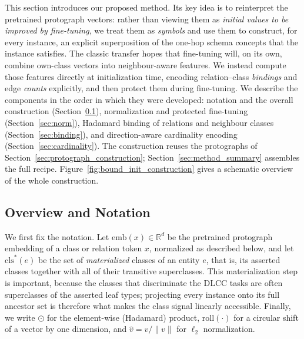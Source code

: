 \documentclass[a4paper,oneside,bibliography=totoc]{scrbook}
\begin{document}
This section introduces our proposed method. Its key idea is to reinterpret the
pretrained protograph vectors: rather than viewing them as \emph{initial values
to be improved by fine-tuning}, we treat them as \emph{symbols} and use them to
construct, for every instance, an explicit superposition of the one-hop schema
concepts that the instance satisfies. The classic transfer hopes that
fine-tuning will, on its own, combine own-class vectors into neighbour-aware
features. We instead compute those features directly at initialization time,
encoding relation--class \emph{bindings} and edge \emph{counts} explicitly, and
then protect them during fine-tuning. We describe
the components in the order in which they were developed: notation and the
overall construction (Section~\ref{sec:method_overview}), normalization and
protected fine-tuning (Section~\ref{sec:norm}), Hadamard binding of relations
and neighbour classes (Section~\ref{sec:binding}), and direction-aware
cardinality encoding (Section~\ref{sec:cardinality}). The construction reuses
the protographs of Section~\ref{sec:protograph_construction};
Section~\ref{sec:method_summary} assembles the full recipe.
Figure~\ref{fig:bound_init_construction} gives a schematic overview of the whole
construction.

\subsection{Overview and Notation}
\label{sec:method_overview}

We first fix the notation. Let $\mathrm{emb}(x) \in \mathbb{R}^d$ be the
pretrained protograph embedding of a class or relation token $x$, normalized as
described below, and let $\mathrm{cls}^*(e)$ be the set of \emph{materialized}
classes of an entity $e$, that is, its asserted classes together with all of
their transitive superclasses. This materialization step is important, because
the classes that discriminate the DLCC tasks are often superclasses of the
asserted leaf types; projecting every instance onto its full ancestor set is
therefore what makes the class signal linearly accessible. Finally, we write
$\odot$ for the element-wise (Hadamard) product, $\mathrm{roll}(\cdot)$ for a
circular shift of a vector by one dimension, and $\widehat{v} = v / \lVert v
\rVert$ for $\ell_2$ normalization.
\end{document}
